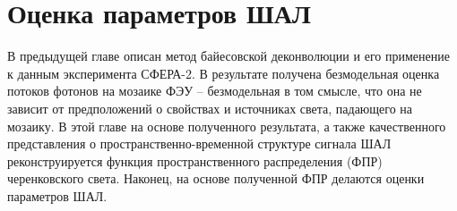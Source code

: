 \documentclass[12pt]{book}
\begin{document}
	\chapter{Оценка параметров ШАЛ}
	
	В предыдущей главе описан метод байесовской деконволюции и его применение к данным эксперимента СФЕРА-2. В результате получена безмодельная оценка потоков фотонов на мозаике ФЭУ -- безмодельная в том смысле, что она не зависит от предположений о свойствах и источниках света, падающего на мозаику. В этой главе на основе полученного результата, а также качественного представления о пространственно-временной структуре сигнала ШАЛ реконструируется функция пространственного распределения (ФПР) черенковского света. Наконец, на основе полученной ФПР делаются оценки параметров ШАЛ.

	\printbibliography
	
\end{document}
